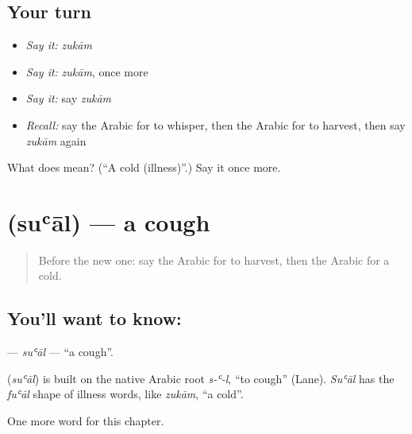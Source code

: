 \subsection*{Your turn}
\begin{itemize}
\raggedright
  \item \emph{Say it:} \emph{zukām}
  \item \emph{Say it:} \emph{zukām}, once more
  \item \emph{Say it:} say \emph{zukām}
  \item \emph{Recall:} say the Arabic for to whisper, then the Arabic for to harvest, then say \emph{zukām} again
\end{itemize}

\begin{tcolorbox}[breakable,colback=teal!4,colframe=teal!35!black,title={Before you move on}]
What does  mean? (\textquotedblleft{}A cold (illness)\textquotedblright{}.) Say it once more.
\end{tcolorbox}
\section[\texorpdfstring{\ar{سعال} (suʿāl)}{سعال (suʿāl)}]{ (suʿāl) — a cough}

\label{lesson:AR-C200-sual}



\begin{quote}
Before the new one: say the Arabic for to harvest, then the Arabic for a cold.
\end{quote}

\subsection*{You'll want to know: }
\textbf{} — \emph{suʿāl} — \textquotedblleft{}a cough\textquotedblright{}.

\begin{cousinweb}
\textbf{} (\emph{suʿāl}) is built on the native Arabic root \emph{s-ʿ-l}, \textquotedblleft{}to cough\textquotedblright{} (Lane). \emph{Suʿāl} has the \emph{fuʿāl} shape of illness words, like \emph{zukām}, \textquotedblleft{}a cold\textquotedblright{}.
\end{cousinweb}

\begin{grammarlens}[title={What you've built}]
One more word for this chapter.
\end{grammarlens}

